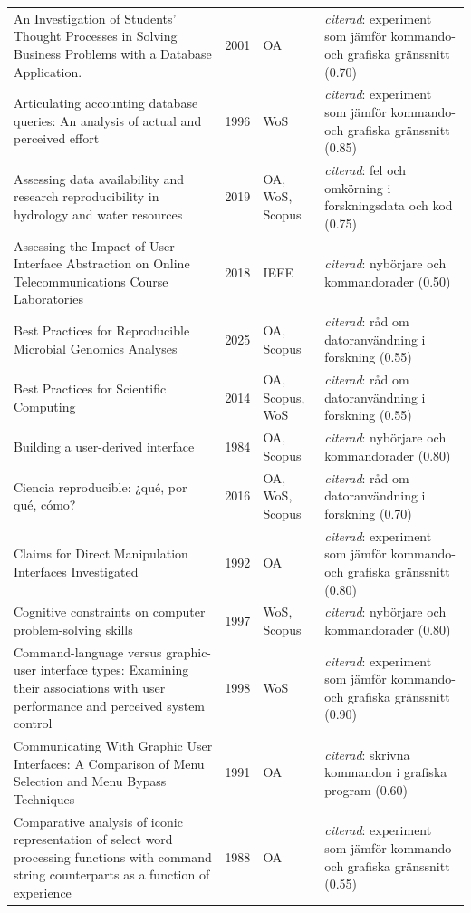 \begin{longtable}{@{}%
  >{\raggedright\arraybackslash}p{}c%
  >{\raggedright\arraybackslash}p{}%
  >{\raggedright\arraybackslash}p{}@{}}
An Investigation of Students' Thought Processes in Solving Business Problems with a Database Application. & 2001 & OA & \emph{citerad}: experiment som jämför kommando- och grafiska gränssnitt (0.70) \\
Articulating accounting database queries: An analysis of actual and perceived effort & 1996 & WoS & \emph{citerad}: experiment som jämför kommando- och grafiska gränssnitt (0.85) \\
Assessing data availability and research reproducibility in hydrology and water resources & 2019 & OA, WoS, Scopus & \emph{citerad}: fel och omkörning i forskningsdata och kod (0.75) \\
Assessing the Impact of User Interface Abstraction on Online Telecommunications Course Laboratories & 2018 & IEEE & \emph{citerad}: nybörjare och kommandorader (0.50) \\
Best Practices for Reproducible Microbial Genomics Analyses & 2025 & OA, Scopus & \emph{citerad}: råd om datoranvändning i forskning (0.55) \\
Best Practices for Scientific Computing & 2014 & OA, Scopus, WoS & \emph{citerad}: råd om datoranvändning i forskning (0.55) \\
Building a user-derived interface & 1984 & OA, Scopus & \emph{citerad}: nybörjare och kommandorader (0.80) \\
Ciencia reproducible: ¿qué, por qué, cómo? & 2016 & OA, WoS, Scopus & \emph{citerad}: råd om datoranvändning i forskning (0.70) \\
Claims for Direct Manipulation Interfaces Investigated & 1992 & OA & \emph{citerad}: experiment som jämför kommando- och grafiska gränssnitt (0.80) \\
Cognitive constraints on computer problem-solving skills & 1997 & WoS, Scopus & \emph{citerad}: nybörjare och kommandorader (0.80) \\
Command-language versus graphic-user interface types: Examining their associations with user performance and perceived system control & 1998 & WoS & \emph{citerad}: experiment som jämför kommando- och grafiska gränssnitt (0.90) \\
Communicating With Graphic User Interfaces: A Comparison of Menu Selection and Menu Bypass Techniques & 1991 & OA & \emph{citerad}: skrivna kommandon i grafiska program (0.60) \\
Comparative analysis of iconic representation of select word processing functions with command string counterparts as a function of experience & 1988 & OA & \emph{citerad}: experiment som jämför kommando- och grafiska gränssnitt (0.55) \\

\end{longtable}
